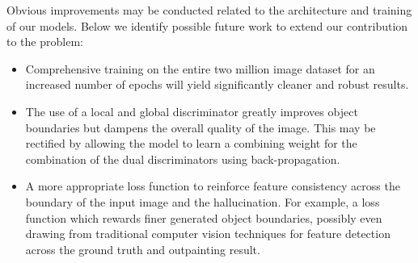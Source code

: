\documentclass{article}
\begin{document}
Obvious improvements may be conducted related to the architecture and training of our models. Below we identify possible future work to extend our contribution to the problem:
\begin{itemize}
\setlength{\partopsep}{0pt}
\setlength{\topsep}{0pt}
\setlength{\itemsep}{1pt}
	\item{Comprehensive training on the entire two million image dataset for an increased number of epochs will yield significantly cleaner and robust results.}
	\item{The use of a local and global discriminator greatly improves object boundaries but dampens the overall quality of the image. This may be rectified by allowing the model to learn a combining weight for the combination of the dual discriminators using back-propagation.}
	\item{A more appropriate loss function to reinforce feature consistency across the boundary of the input image and the hallucination. For example, a loss function which rewards finer generated object boundaries, possibly even drawing from traditional computer vision techniques for feature detection across the ground truth and outpainting result.}
\end{itemize}



\end{document}

